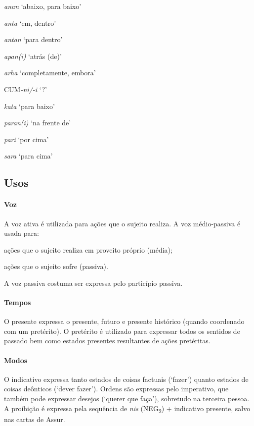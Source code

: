 \begin{multicols}{2}
	\begin{compactenum}[(a)]
		\item *\emph{anan} `abaixo, para baixo'
		\item \emph{anta} `em, dentro'
		\item \emph{antan} `para dentro'
		\item \emph{apan{(i)}} `atrás (de)'
		\item \emph{arha} `completamente, embora'
		\item CUM\emph{-ni/-i} `?'
		\item *\emph{kata} `para baixo'
		\item \emph{paran{(i)}} `na frente de'
		\item \emph{pari} `por cima'
		\item \emph{sara} `para cima'
	\end{compactenum}
\end{multicols}

\subsection{Usos}

\paragraph{Voz}
A voz ativa é utilizada para ações que o sujeito realiza.
A voz médio-passiva é usada para:
\begin{inparaenum}[(a)]
	\item ações que o sujeito realiza em proveito próprio (média);
	\item ações que o sujeito sofre (passiva).
\end{inparaenum}
A voz passiva costuma ser expressa pelo particípio passiva.


\paragraph{Tempos}
O presente expressa o presente, futuro e presente histórico (quando coordenado
com um pretérito).
O pretérito é utilizado para expressar todos os sentidos de passado bem como
estados presentes resultantes de ações pretéritas.


\paragraph{Modos}
O indicativo expressa tanto estados de coisas factuais (`fazer') quanto estados de coisas
deônticos (`dever fazer').
Ordens são expressas pelo imperativo, que também pode expressar desejos (`querer
que faça'), sobretudo na terceira pessoa.
A proibição é expressa pela sequência de \emph{nis} (NEG\textsubscript{2}) +
indicativo presente, salvo nas cartas de Assur.

